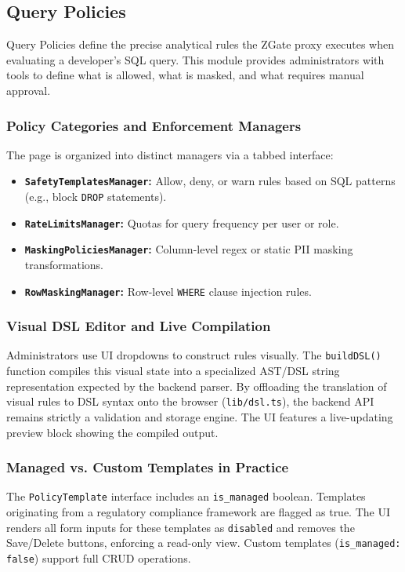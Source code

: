 \subsection{Query Policies}
Query Policies define the precise analytical rules the ZGate proxy executes when evaluating a developer's SQL query. This module provides administrators with tools to define what is allowed, what is masked, and what requires manual approval.

\subsubsection{Policy Categories and Enforcement Managers}
The page is organized into distinct managers via a tabbed interface:
\begin{itemize}
    \item \textbf{\texttt{SafetyTemplatesManager}:} Allow, deny, or warn rules based on SQL patterns (e.g., block \texttt{DROP} statements).
    \item \textbf{\texttt{RateLimitsManager}:} Quotas for query frequency per user or role.
    \item \textbf{\texttt{MaskingPoliciesManager}:} Column-level regex or static PII masking transformations.
    \item \textbf{\texttt{RowMaskingManager}:} Row-level \texttt{WHERE} clause injection rules.
\end{itemize}

\subsubsection{Visual DSL Editor and Live Compilation}
Administrators use UI dropdowns to construct rules visually. The \texttt{buildDSL()} function compiles this visual state into a specialized AST/DSL string representation expected by the backend parser. By offloading the translation of visual rules to DSL syntax onto the browser (\texttt{lib/dsl.ts}), the backend API remains strictly a validation and storage engine. The UI features a live-updating preview block showing the compiled output.

\subsubsection{Managed vs. Custom Templates in Practice}
The \texttt{PolicyTemplate} interface includes an \texttt{is\_managed} boolean. Templates originating from a regulatory compliance framework are flagged as true. The UI renders all form inputs for these templates as \texttt{disabled} and removes the Save/Delete buttons, enforcing a read-only view. Custom templates (\texttt{is\_managed: false}) support full CRUD operations.

